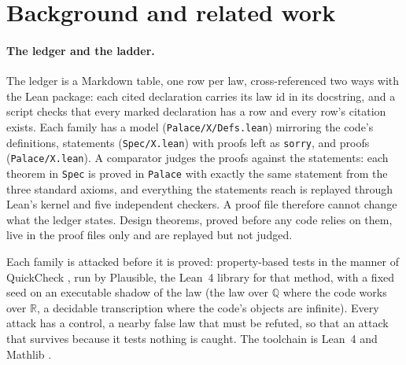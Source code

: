\documentclass[11pt]{article}
\theoremstyle{plain}
\theoremstyle{definition}
\theoremstyle{remark}
\begin{document}
\section{Background and related work}

\paragraph{The ledger and the ladder.} The ledger is a Markdown table, one row per law,
cross-referenced two ways with the Lean package: each cited declaration carries its law id in its
docstring, and a script checks that every marked declaration has a row and every row's citation
exists. Each family has a model (\texttt{Palace/X/Defs.lean}) mirroring the code's definitions,
statements (\texttt{Spec/X.lean}) with proofs left as \texttt{sorry}, and proofs
(\texttt{Palace/X.lean}). A comparator judges the proofs against the statements: each theorem in
\texttt{Spec} is proved in \texttt{Palace} with exactly the same statement from the three standard
axioms, and everything the statements reach is replayed through Lean's kernel and five independent
checkers. A proof file therefore cannot change what the ledger states. Design theorems, proved
before any code relies on them, live in the proof files only and are replayed but not judged.

Each family is attacked before it is proved: property-based tests in the manner of QuickCheck
\citep{claessen2000}, run by Plausible, the Lean~4 library for that method, with a fixed seed on
an executable shadow of the law (the law over $\mathbb{Q}$ where the code works over
$\mathbb{R}$, a decidable transcription where the code's objects are infinite). Every attack has a
control, a nearby false law that must be refuted, so that an attack that survives because it
tests nothing is caught. The toolchain is Lean~4 \citep{demoura2021} and Mathlib
\citep{mathlib2020}.
\end{document}
